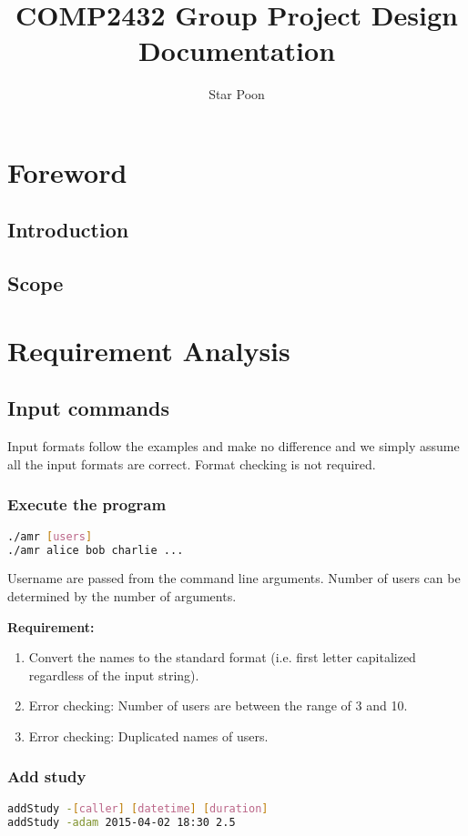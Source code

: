 \documentclass[12pt,a4paper]{report}
\author{Star Poon}
\title{COMP2432 Group Project Design Documentation}
\begin{document}
\maketitle
\tableofcontents
\chapter{Foreword}
\section{Introduction}
\section{Scope}
\chapter{Requirement Analysis}
\section{Input commands}
Input formats follow the examples and make no difference and we simply assume all the input formats are correct.
Format checking is not required. 

\subsection{Execute the program}
\begin{lstlisting}[language=bash,basicstyle=\ttfamily,keywordstyle=\bfseries]
./amr [users]
./amr alice bob charlie ...
\end{lstlisting}
Username are passed from the command line arguments. Number of users can be determined by the number of arguments. 

\textbf{Requirement:}
\begin{enumerate}
\item Convert the names to the standard format (i.e. first letter capitalized regardless of the input string).
\item Error checking: Number of users are between the range of 3 and 10.
\item Error checking: Duplicated names of users.
\end{enumerate}

\subsection{Add study}
\begin{lstlisting}[language=bash,basicstyle=\ttfamily,keywordstyle=\bfseries]
addStudy -[caller] [datetime] [duration]
addStudy -adam 2015-04-02 18:30 2.5
\end{lstlisting}
\end{document}
